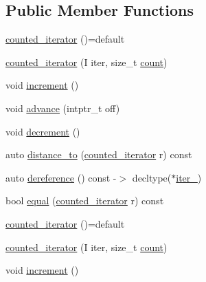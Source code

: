 \subsection*{Public Member Functions}
\begin{DoxyCompactItemize}
\item 
\mbox{\hyperlink{structrah_1_1view_1_1counted__iterator_a73f275166ac5f41bd93d96ccab15eab0}{counted\+\_\+iterator}} ()=default
\item 
\mbox{\hyperlink{structrah_1_1view_1_1counted__iterator_aa26e9c047e175303c296758316634890}{counted\+\_\+iterator}} (I iter, size\+\_\+t \mbox{\hyperlink{namespacerah_aa528865cc4a45d4eb276329554f16b4b}{count}})
\item 
void \mbox{\hyperlink{structrah_1_1view_1_1counted__iterator_a8113f67743f49650c0b4c872bcfd560e}{increment}} ()
\item 
void \mbox{\hyperlink{structrah_1_1view_1_1counted__iterator_abef44b581abb0c70a79dbd6a61ccd200}{advance}} (intptr\+\_\+t off)
\item 
void \mbox{\hyperlink{structrah_1_1view_1_1counted__iterator_abeb34df8feb243fce3eec27d45b19aa2}{decrement}} ()
\item 
auto \mbox{\hyperlink{structrah_1_1view_1_1counted__iterator_afee4b1d8525979cc4b711eba9b524f1d}{distance\+\_\+to}} (\mbox{\hyperlink{structrah_1_1view_1_1counted__iterator}{counted\+\_\+iterator}} r) const
\item 
auto \mbox{\hyperlink{structrah_1_1view_1_1counted__iterator_aa0478a9f3d2083f2cd9c42d32e8e4dd5}{dereference}} () const -\/$>$ decltype($\ast$\mbox{\hyperlink{structrah_1_1view_1_1counted__iterator_a907dba6ac64293e4c5718e522da4972e}{iter\+\_\+}})
\item 
bool \mbox{\hyperlink{structrah_1_1view_1_1counted__iterator_a71ee9eea167eec16b04373885dbff741}{equal}} (\mbox{\hyperlink{structrah_1_1view_1_1counted__iterator}{counted\+\_\+iterator}} r) const
\item 
\mbox{\hyperlink{structrah_1_1view_1_1counted__iterator_a73f275166ac5f41bd93d96ccab15eab0}{counted\+\_\+iterator}} ()=default
\item 
\mbox{\hyperlink{structrah_1_1view_1_1counted__iterator_aa26e9c047e175303c296758316634890}{counted\+\_\+iterator}} (I iter, size\+\_\+t \mbox{\hyperlink{namespacerah_aa528865cc4a45d4eb276329554f16b4b}{count}})
\item 
void \mbox{\hyperlink{structrah_1_1view_1_1counted__iterator_a8113f67743f49650c0b4c872bcfd560e}{increment}} ()
\item 

\end{DoxyCompactItemize}
